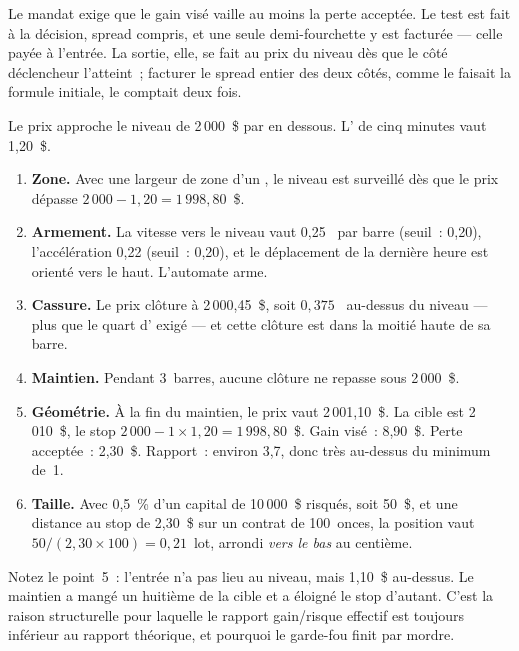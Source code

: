 Le mandat exige que le gain visé vaille au moins la perte acceptée. Le test
est fait à la décision, spread compris, et une seule demi-fourchette y est
facturée --- celle payée à l'entrée. La sortie, elle, se fait au prix du
niveau dès que le côté déclencheur l'atteint~; facturer le spread entier des
deux côtés, comme le faisait la formule initiale, le comptait deux fois.

\begin{examplebox}[title=\textbf{\color{white}\textsf{Un breakout, chiffres à l'appui}}]
Le prix approche le niveau de 2\,000~\$ par en dessous. L' de cinq
minutes vaut 1,20~\$.

\begin{enumerate}
  \item \textbf{Zone.} Avec une largeur de zone d'un , le niveau est
  surveillé dès que le prix dépasse $2\,000 - 1{,}20 = 1\,998{,}80$~\$.
  \item \textbf{Armement.} La vitesse vers le niveau vaut 0,25~ par
  barre (seuil~: 0,20), l'accélération 0,22 (seuil~: 0,20), et le déplacement
  de la dernière heure est orienté vers le haut. L'automate arme.
  \item \textbf{Cassure.} Le prix clôture à 2\,000,45~\$, soit
  $0{,}375$~ au-dessus du niveau --- plus que le quart d'
  exigé --- et cette clôture est dans la moitié haute de sa barre.
  \item \textbf{Maintien.} Pendant 3~barres, aucune clôture ne repasse sous
  2\,000~\$.
  \item \textbf{Géométrie.} À la fin du maintien, le prix vaut 2\,001,10~\$.
  La cible est 2\,010~\$, le stop $2\,000 - 1 \times 1{,}20 = 1\,998{,}80$~\$.
  Gain visé~: 8,90~\$. Perte acceptée~: 2,30~\$. Rapport~: environ 3,7, donc
  très au-dessus du minimum de~1.
  \item \textbf{Taille.} Avec 0,5~\% d'un capital de 10\,000~\$ risqués, soit
  50~\$, et une distance au stop de 2,30~\$ sur un contrat de 100~onces, la
  position vaut $50 / (2{,}30 \times 100) = 0{,}21$~lot, arrondi \emph{vers le
  bas} au centième.
\end{enumerate}

Notez le point~5~: l'entrée n'a pas lieu au niveau, mais 1,10~\$ au-dessus. Le
maintien a mangé un huitième de la cible et a éloigné le stop d'autant. C'est
la raison structurelle pour laquelle le rapport gain/risque effectif est
toujours inférieur au rapport théorique, et pourquoi le garde-fou finit par
mordre.
\end{examplebox}

